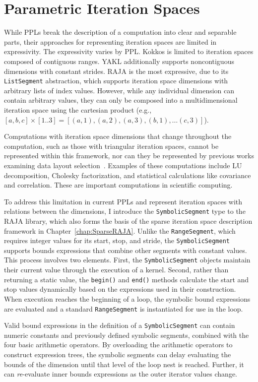 \section{Parametric Iteration Spaces}

While PPLs break the description of a computation into clear and separable parts, their approaches for representing iteration spaces are limited in expressivity.
The expressivity varies by PPL\@.
Kokkos is limited to iteration spaces composed of contiguous ranges.
YAKL additionally supports noncontiguous dimensions with constant strides.
RAJA is the most expressive, due to its \verb.ListSegment. abstraction, which supports iteration space dimensions with arbitrary lists of index values.
However, while any individual dimension can contain arbitrary values, they can only be composed into a multidimensional iteration space using the cartesian product (e.g., $[a, b, c] \times [1..3] = [(a,1), (a,2), (a,3), (b,1), \dots (c,3)]$).

Computations with iteration space dimensions that change throughout the computation, such as those with triangular iteration spaces, cannot be represented within this framework, nor can they be represented by previous works examining data layout selection~\cite{kennedy1998automatic}. 
Examples of these computations include LU decomposition, Cholesky factorization, and statistical calculations like covariance and correlation.
These are important computations in scientific computing.

To address this limitation in current PPLs and represent iteration spaces with relations between the dimensions, I introduce the \verb.SymbolicSegment. type to the RAJA library, which also forms the basis of the sparse iteration space description framework in Chapter~\ref{chap:SparseRAJA}. 
Unlike the \verb.RangeSegment., which requires integer values for its start, stop, and stride, the \verb.SymbolicSegment. supports bounds expressions that combine other segments with constant values. 
This process involves two elements.
First, the \verb.SymbolicSegment. objects maintain their current value through the execution of a kernel. 
Second, rather than returning a static value, the \verb.begin(). and \verb.end(). methods calculate the start and stop values dynamically based on the expressions used in their construction. 
When execution reaches the beginning of a loop, the symbolic bound expressions are evaluated and a standard \verb.RangeSegment. is instantiated for use in the loop.

Valid bound expressions in the definition of a \verb.SymbolicSegment. can contain numeric constants and previously defined symbolic segments, combined with the four basic arithmetic operators. 
By overloading the arithmetic operators to construct expression trees, the symbolic segments can delay evaluating the bounds of the dimension until that level of the loop nest is reached.
Further, it can \textit{re}-evaluate inner bounds expressions as the outer iterator values change.

